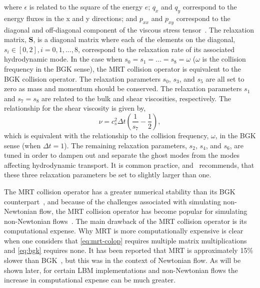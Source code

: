 \documentclass[pdftex,ms]{pittetd}
\newcommand{\relaxM}{\mathbf{S}}
\begin{document}
\noindent where $\epsilon$ is related to the square of the energy $e$; $q_x$ and $q_y$ correspond to the energy fluxes in the x and y directions; and $p_{xx}$ and $p_{xy}$ correspond to the diagonal and off-diagonal component of the viscous stress tensor~\cite{lallemand2000theory}. %
The relaxation matrix, $\relaxM$, is a diagonal matrix where each of the elements on the diagonal, $s_i \in [0, 2], i = 0, 1, ..., 8$, correspond to the relaxation rate of its associated hydrodynamic mode.
In the case when $s_0 = s_1 = ... = s_8 = \omega$ ($\omega$ is the collision frequency in the BGK sense), the MRT collision operator is equivalent to the BGK collision operator.
The relaxation parameters $s_0$, $s_3$, and $s_5$ are all set to zero as mass and momentum should be conserved.
The relaxation parameters $s_1$ and $s_7 = s_8$ are related to the bulk and shear viscosities, respectively.
The relationship for the shear viscosity is given by,
\begin{equation} \label{eq:mrt-s7}
\nu = c_s^2 \Delta t (\frac{1}{s_7} - \frac{1}{2}),
\end{equation}
\noindent which is equivalent with the relationship to the collision frequency, $\omega$, in the BGK sense (when $\Delta t = 1$).
The remaining relaxation parameters, $s_2$, $s_4$, and $s_6$, are tuned in order to dampen out and separate the ghost modes from the modes affecting hydrodynamic transport.
It is common practice, and~\citet{lallemand2000theory} recommends, that these three relaxation parameters be set to slightly larger than one.

The MRT collision operator has a greater numerical stability than its BGK counterpart~\cite{lallemand2000theory,dellar2003incompressible,d2002multiple}, and because of the challenges associated with simulating non-Newtonian flow, the MRT collision operator has become popular for simulating non-Newtonian flows~\cite{chen2014simulations,fallah2012multiple,tang2011bingham,vikhansky2008lattice,chai2011multiple,grasinger2015simulation}.
The main drawback of the MRT collision operator is its computational expense.
Why MRT is more computationally expensive is clear when one considers that \eqref{eq:mrt-colop} requires multiple matrix multiplications and \eqref{eq:bgk} requires none.
It has been reported that MRT is approximately 15\% slower than BGK~\cite{d2002multiple}, but this was in the context of Newtonian flow.
As will be shown later, for certain LBM implementations and non-Newtonian flows the increase in computational expense can be much greater.
\end{document}
